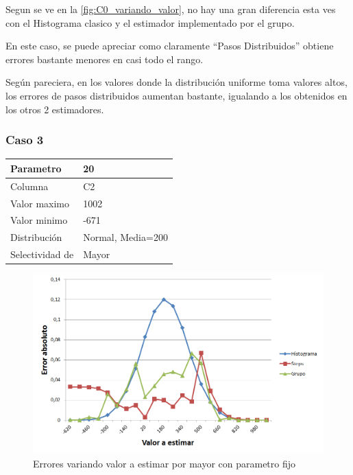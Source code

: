 		Segun se ve en la \ref{fig:C0_variando_valor}, no hay una gran diferencia esta ves con el Histograma clasico y el estimador implementado por el grupo. 
		
		En este caso, se puede apreciar como claramente ``Pasos Distribuidos'' obtiene errores bastante menores en casi todo el rango.
		
		Seg\'un pareciera, en los valores donde la distribuci\'on uniforme toma valores altos, los errores de pasos distribuidos aumentan bastante, igualando a los obtenidos en los otros 2 estimadores.

		\subsubsection*{Caso 3}
		
		\begin{tabular}{| l | l |}
		\hline
		Parametro & 20 \\
		\hline
		Columna & C2 \\
		\hline
		Valor maximo & 1002 \\
		\hline
		Valor minimo & -671 \\
		\hline
		Distribuci\'on & Normal, Media=200 \\
		\hline
		Selectividad de & Mayor \\
		\hline
		\end{tabular}

		\newpage					

	\begin{figure}[H]
	  \begin{center}
	    \includegraphics[scale=.40]{imagenes/C2_variando_valor_greater.png}
	    \caption{Errores variando valor a estimar por mayor con parametro fijo} 
	    \label{fig:C2_variando_valor_greater}
	  \end{center}
	\end{figure}
		
